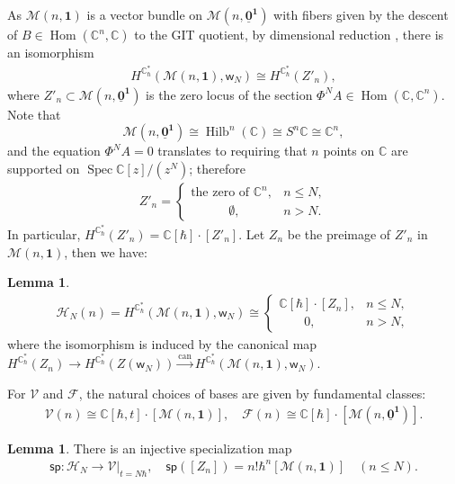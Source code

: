 \documentclass[10pt]{amsart}
\theoremstyle{definition}
\newtheorem{Lemma}[Theorem]{Lemma}
\numberwithin{equation}{section}
\newcommand{\bC}{\mathbb{C}}
\newcommand{\cM}{\mathcal{M}}
\newcommand{\sw}{\mathsf{w}}
\newcommand{\can}{\operatorname{can}}
\newcommand{\Hilb}{\operatorname{Hilb}}
\newcommand{\Hom}{\operatorname{Hom}}
\newcommand{\Spec}{\operatorname{Spec}}
\begin{document}
As $\cM(n,\mathbf 1)$ is a vector bundle on $\cM(n,\underline{\mathbf 0}^{\mathbf 1})$ with fibers given by the descent of $B\in \Hom(\bC^n,\bC)$ to the GIT quotient,
by dimensional reduction \cite[Thm.~A.1]{Dav}, there is an isomorphism
\begin{align*}
    H^{\bC^*_\hbar}(\cM(n,\mathbf 1),\sw_N)\cong H^{\bC^*_\hbar}(Z'_n),
\end{align*}
where $Z'_n\subset \cM(n,\underline{\mathbf 0}^{\mathbf 1})$ is the zero locus of the section $\Phi^NA\in \Hom(\bC,\bC^n)$. Note that 
$$\cM(n,\underline{\mathbf 0}^{\mathbf 1})\cong \Hilb^n(\bC)\cong S^n\bC\cong \bC^n, $$ 
and the equation $\Phi^NA=0$ translates to requiring that $n$ points on $\bC$ are supported on $\Spec \bC[z]/(z^N)$; therefore
\begin{align*}
    Z'_n=\begin{cases}
        \text{the zero of $\bC^n$},& n\leqslant N,\\
       \quad \quad \quad \emptyset, & n>N.
    \end{cases}
\end{align*}
In particular, $H^{\bC^*_\hbar}(Z'_n)=\bC[\hbar]\cdot[Z'_n]$. Let $Z_n$ be the preimage of $Z'_n$ in $\cM(n,\mathbf 1)$, then we have:
\begin{Lemma}
\begin{align*}
    \mathcal H_N(n)=H^{\bC^*_\hbar}(\cM(n,\mathbf 1),\sw_N)\cong \begin{cases}
        \bC[\hbar]\cdot[Z_n], & n\leqslant N,\\
       \quad\quad  0, & n>N,
    \end{cases}
\end{align*}
where the isomorphism is induced by the canonical map $H^{\bC^*_\hbar}(Z_n)\to H^{\bC^*_\hbar}(Z(\sw_N))\xrightarrow{\can}H^{\bC^*_\hbar}(\cM(n,\mathbf 1),\sw_N)$.
\end{Lemma}
For $\mathcal V$ and $\mathcal F$, the natural choices of bases are given by fundamental classes:
\begin{align*}
    \mathcal V(n)\cong \bC[\hbar,t]\cdot[\cM(n,\mathbf 1)],\quad \mathcal F(n)\cong \bC[\hbar]\cdot[\cM(n,\underline{\mathbf 0}^{\mathbf 1})].
\end{align*}
\begin{Lemma}\label{lem on injec sp higher spin}
There is an injective specialization map 
\begin{align*}
    \mathsf{sp}\colon \mathcal H_N\to \mathcal V\big|_{t=N\hbar}, \quad\mathsf{sp}([Z_n])=n!\hbar^n [\cM(n,\mathbf 1)] \quad ( n\leqslant N).
\end{align*}
\end{Lemma}
\end{document}
